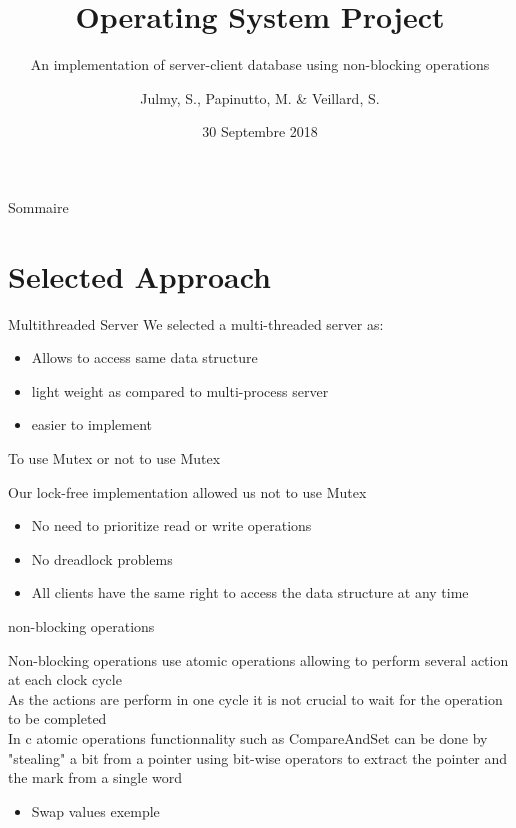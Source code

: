 \documentclass{bredelebeamer}
\title[OS Project]{Operating System Project}
\subtitle{An implementation of server-client database using non-blocking operations}
\author{Julmy, S., Papinutto, M. \& Veillard, S.}
\institute[UniFr]{}
\date{30 Septembre 2018}
\begin{document}
    \begin{frame}
        \titlepage
    \end{frame}

    \begin{frame}{Sommaire}
        \tableofcontents
    \end{frame}

    \section{Selected Approach}

    \begin{frame}{Multithreaded Server}
        We selected a multi-threaded server as: \\
        \begin{itemize}
            \item Allows to access same data structure
            \item light weight as compared to multi-process server
            \item easier to implement
        \end{itemize}
    \end{frame}

     \begin{frame}{To use Mutex or not to use Mutex}

         Our lock-free implementation allowed us not to use Mutex \\

        \begin{itemize}
            \item No need to prioritize read or write operations
            \item No dreadlock problems
            \item All clients have the same right to access the data structure at any time
        \end{itemize}
    \end{frame}

     \begin{frame}{non-blocking operations}

        Non-blocking operations use atomic operations allowing to perform several action at each clock cycle\\
        As the actions are perform in one cycle it is not crucial to wait for the operation to be completed \\
        In c atomic operations functionnality such as CompareAndSet can be done by "stealing" a bit from a pointer
        using bit-wise operators to extract the pointer and the mark from a single word \\

        \begin{itemize}
            \item Swap values exemple
        \end{itemize}
    \end{frame}
\end{document}
